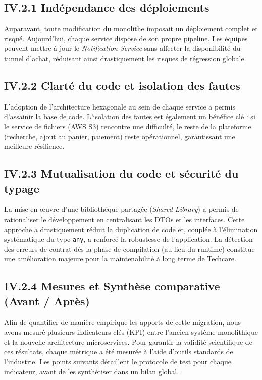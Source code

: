 \subsection{IV.2.1 Indépendance des déploiements}
Auparavant, toute modification du monolithe imposait un déploiement complet et risqué. Aujourd'hui, chaque service dispose de son propre pipeline. Les équipes peuvent mettre à jour le \textit{Notification Service} sans affecter la disponibilité du tunnel d'achat, réduisant ainsi drastiquement les risques de régression globale.

\subsection{IV.2.2 Clarté du code et isolation des fautes}
L'adoption de l'architecture hexagonale au sein de chaque service a permis d'assainir la base de code. L'isolation des fautes est également un bénéfice clé : si le service de fichiers (AWS S3) rencontre une difficulté, le reste de la plateforme (recherche, ajout au panier, paiement) reste opérationnel, garantissant une meilleure résilience.

\subsection{IV.2.3 Mutualisation du code et sécurité du typage}
La mise en œuvre d'une bibliothèque partagée (\textit{Shared Library}) a permis de rationaliser le développement en centralisant les DTOs et les interfaces. Cette approche a drastiquement réduit la duplication de code et, couplée à l'élimination systématique du type \texttt{any}, a renforcé la robustesse de l'application. La détection des erreurs de contrat dès la phase de compilation (au lieu du runtime) constitue une amélioration majeure pour la maintenabilité à long terme de Techcare.

\subsection{IV.2.4 Mesures et Synthèse comparative (Avant / Après)}
Afin de quantifier de manière empirique les apports de cette migration, nous avons mesuré plusieurs indicateurs clés (KPI) entre l'ancien système monolithique et la nouvelle architecture microservices. Pour garantir la validité scientifique de ces résultats, chaque métrique a été mesurée à l'aide d'outils standards de l'industrie. Les points suivants détaillent le protocole de test pour chaque indicateur, avant de les synthétiser dans un bilan global.

